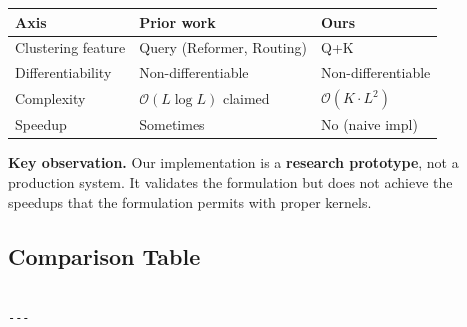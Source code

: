 \begin{table}[H]
\centering
\small
\begin{tabular}{lll}
\toprule
\textbf{Axis} & \textbf{Prior work} & \textbf{Ours} \\
\midrule
Clustering feature & Query (Reformer, Routing) & Q+K \\
Differentiability & Non-differentiable & Non-differentiable \\
Complexity & $\mathcal{O}(L \log L)$ claimed & $\mathcal{O}(K \cdot L^2)$ \\
Speedup & Sometimes & No (naive impl) \\
\bottomrule
\end{tabular}
\end{table}

\textbf{Key observation.} Our implementation is a \textbf{research prototype}, not a 
production system. It validates the formulation but does not achieve the 
speedups that the formulation permits with proper kernels.



\subsection{Comparison Table}

\begin{lstlisting}

---
\end{lstlisting}